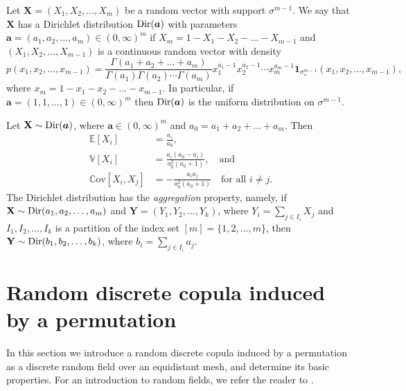 \documentclass[12pt,a4paper]{amsart}
\theoremstyle{definition}
\newcommand{\EE}{\mathbb{E}}
\newcommand{\VV}{\mathbb{V}}
\newcommand{\Cov}{\mathbb{C}\mathrm{ov}}
\newcommand{\be}{\boldsymbol{1}}
\newcommand{\ba}{\boldsymbol{a}}
\newcommand{\Dir}{\textup{Dir}}
\begin{document}
Let $\mathbf{X}=(X_1,X_2,\ldots,X_m)$ be a random vector with support $\sigma^{m-1}$. We say that $\mathbf{X}$ has a Dirichlet distribution $\Dir(\ba)$ with parameters $\ba=(a_1,a_2,\ldots,a_m) \in (0,\infty)^m$ if $X_{m}=1-X_1-X_2-\ldots-X_{m-1}$ and $(X_1,X_2,\ldots,X_{m-1})$ is a continuous random vector with density 
\begin{equation}\label{eq:density}
    p(x_1,x_2,\ldots,x_{m-1})=\frac{\Gamma(a_1+a_2+\ldots+a_m)}{\Gamma(a_1)\Gamma(a_2)\cdots\Gamma(a_m)} x_1^{a_1-1} x_2^{a_2-1} \cdots x_{m}^{a_{m}-1} \be_{\sigma_*^{m-1}}(x_1,x_2,\ldots,x_{m-1}),
\end{equation}
where $x_m=1-x_1-x_2-\ldots-x_{m-1}$.
In particular, if $\ba=(1,1,\ldots,1) \in (0,\infty)^m$ then $\Dir(\ba)$ is the uniform distribution on $\sigma^{m-1}$.

Let $\mathbf{X} \sim \Dir(\ba)$, where $\ba \in (0,\infty)^m$ and $a_0=a_1+a_2+\ldots+a_m$. Then
\begin{equation}\label{eq:EVC}
\begin{aligned}
    \EE[X_i] &=\frac{a_i}{a_0}, \\
    \VV[X_i] &=\frac{a_i(a_0-a_i)}{a_0^2(a_0+1)}, \quad \text{and}\\
    \Cov[X_i,X_j] &=-\frac{a_ia_j}{a_0^2(a_0+1)} \quad \text{for all $i \ne j$.}
\end{aligned}
\end{equation}
The Dirichlet distribution has the \emph{aggregation} property, namely, if $\mathbf{X} \sim \Dir(a_1,a_2,\ldots,a_m)$ and $\mathbf{Y}=(Y_1,Y_2,\ldots,Y_k)$, where $Y_i=\sum_{j \in I_i} X_j$ and $I_1,I_2,\ldots,I_k$ is a partition of the index set $[m]=\{1,2,\ldots,m\}$, then $\mathbf{Y} \sim \Dir(b_1,b_2,\ldots,b_k)$, where $b_i=\sum_{j \in I_i} a_j$.





\section{Random discrete copula induced by a permutation} \label{se:permutation}

In this section we introduce a random discrete copula induced by a permutation as a discrete random field over an equidistant mesh, and determine its basic properties. For an introduction to random fields, we refer the reader to \cite{AdlTay07}.
\end{document}

